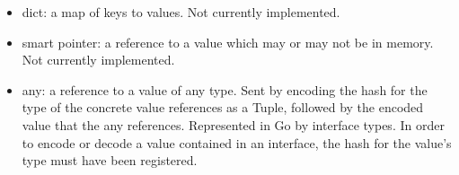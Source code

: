 \begin{itemize}
	\item dict: a map of keys to values. Not currently implemented.

	\item smart pointer: a reference to a value which may or may not be in memory. Not currently implemented.

	\item any: a reference to a value of any type. Sent by encoding the hash for the type of the concrete
value references as a Tuple, followed by the encoded value that the any references. Represented
in Go by interface types. In order to encode or decode a value contained in an interface,
the hash for the value's type must have been registered.

\end{itemize}
